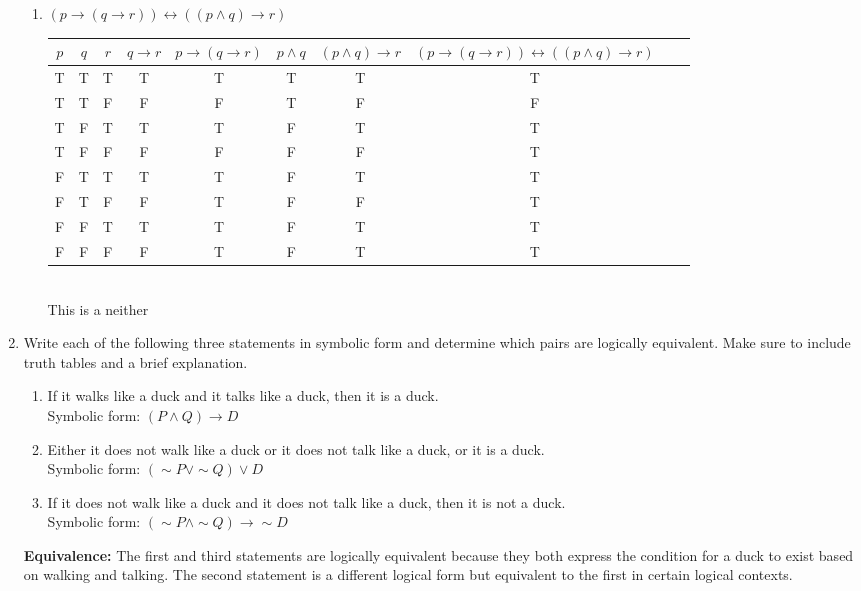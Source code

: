 \documentclass{article}
\begin{document}
\begin{enumerate}
\begin{enumerate}
	
	\item \( (p \rightarrow (q \rightarrow r)) \leftrightarrow ((p \land q) \rightarrow r) \) \\
	\begin{tabular}{|c|c|c|c|c|c|c|c|c|c|}
		\hline
		$p$ & $q$ & $r$ & $q \rightarrow r$ & $p \rightarrow (q \rightarrow r)$ & $p \land q$ & $(p \land q) \rightarrow r$ & $(p \rightarrow (q \rightarrow r)) \leftrightarrow ((p \land q) \rightarrow r)$ \\
		\hline
		T & T & T & T & T & T & T & T \\
		T & T & F & F & F & T & F & F \\
		T & F & T & T & T & F & T & T \\
		T & F & F & F & F & F & F & T \\
		F & T & T & T & T & F & T & T \\
		F & T & F & F & T & F & F & T \\
		F & F & T & T & T & F & T & T \\
		F & F & F & F & T & F & T & T \\
		\hline
	\end{tabular}
	\\
	This is a neither
\end{enumerate}
		
		\item Write each of the following three statements in symbolic form and determine which pairs are logically equivalent. Make sure to include truth tables and a brief explanation.
		\begin{enumerate}
			\item If it walks like a duck and it talks like a duck, then it is a duck. \\
			Symbolic form: \( (P \land Q) \rightarrow D \)
			
			\item Either it does not walk like a duck or it does not talk like a duck, or it is a duck. \\
			Symbolic form: \( (\sim P \lor \sim Q) \lor D \)
			
			\item If it does not walk like a duck and it does not talk like a duck, then it is not a duck. \\
			Symbolic form: \( (\sim P \land \sim Q) \rightarrow \sim D \)
		\end{enumerate}
		\textbf{Equivalence:} The first and third statements are logically equivalent because they both express the condition for a duck to exist based on walking and talking. The second statement is a different logical form but equivalent to the first in certain logical contexts.
		

\end{enumerate}
\end{document}
